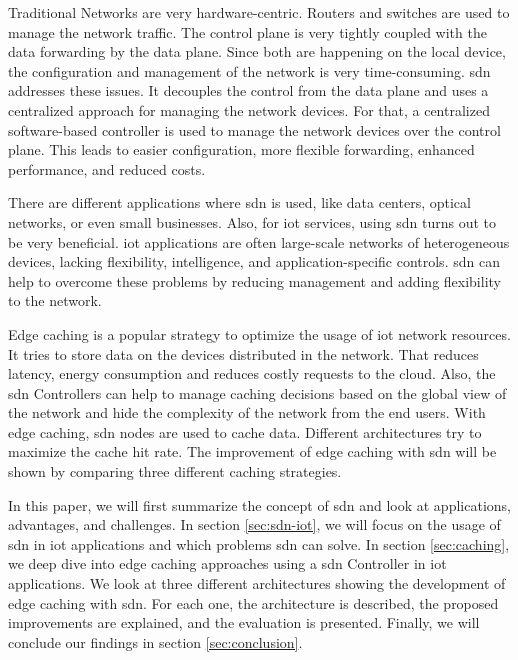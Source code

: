 \documentclass[conference]{IEEEtran}
\begin{document}
	Traditional Networks are very hardware-centric. Routers and switches are used to manage the network traffic. The control plane is very tightly coupled with the data forwarding by the data plane. Since both are happening on the local device, the configuration and management of the network is very time-consuming. \acf{sdn} addresses these issues. It decouples the control from the data plane and uses a centralized approach for managing the network devices. For that, a centralized software-based controller is used to manage the network devices over the control plane. This leads to easier configuration, more flexible forwarding, enhanced performance, and reduced costs. \cite{Jefia2018-pj} \cite{MASOUDI20161}
	
	There are different applications where \ac{sdn} is used, like data centers, optical networks, or even small businesses. Also, for \ac{iot} services, using \ac{sdn} turns out to be very beneficial. \ac{iot} applications are often large-scale networks of heterogeneous devices, lacking flexibility, intelligence, and application-specific controls. \ac{sdn} can help to overcome these problems by reducing management and adding flexibility to the network.
   
   
	Edge caching is a popular strategy to optimize the usage of \ac{iot} network resources. It tries to store data on the devices distributed in the network. That reduces latency, energy consumption and reduces costly requests to the cloud.  Also, the \ac{sdn} Controllers can help to manage caching decisions based on the global view of the network and hide the complexity of the network from the end users. With edge caching, \ac{sdn} nodes are used to cache data. Different architectures try to maximize the cache hit rate. The improvement of edge caching with \ac{sdn} will be shown by comparing three different caching strategies.
   
   
	In this paper, we will first summarize the concept of \ac{sdn} and look at applications, advantages, and challenges. In section \ref{sec:sdn-iot}, we will focus on the usage of \ac{sdn} in \ac{iot} applications and which problems \ac{sdn} can solve. In section \ref{sec:caching}, we deep dive into edge caching approaches using a \ac{sdn} Controller in \ac{iot} applications. We look at three different architectures showing the development of edge caching with \ac{sdn}. For each one, the architecture is described, the proposed improvements are explained, and the evaluation is presented. Finally, we will conclude our findings in section \ref{sec:conclusion}. 
\end{document}
